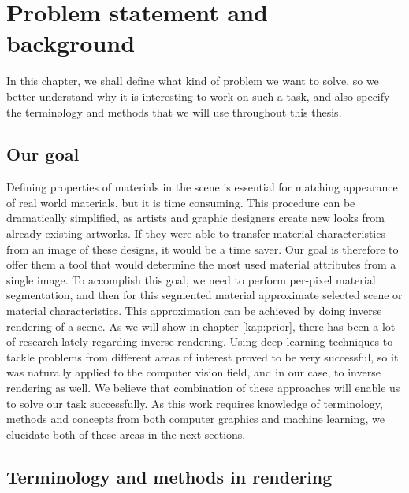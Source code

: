 \chapter{Problem statement and background}
\label{kap:problem}

In this chapter, we shall define what kind of problem we want to solve, so we better understand why it is interesting to work on such a task, and also specify the terminology and methods that we will use throughout this thesis.

\section{Our goal}
Defining properties of materials in the scene is essential for matching appearance of real world materials, but it is time consuming. This procedure can be dramatically simplified, as artists and graphic designers create new looks from already existing artworks. If they were able to transfer material characteristics from an image of these designs, it would be a time saver. Our goal is therefore to offer them a tool that would determine the most used material attributes from a single image.
\newline
To accomplish this goal, we need to perform per-pixel material segmentation, and then for this segmented material approximate selected scene or material characteristics. This approximation can be achieved by doing inverse rendering of a scene.
\newline
As we will show in chapter \ref{kap:prior}, there has been a lot of research lately regarding inverse rendering. Using deep learning techniques to tackle problems from different areas of interest proved to be very successful, so it was naturally applied to the computer vision field, and in our case, to inverse rendering as well. We believe that combination of these approaches will enable us to solve our task successfully.
\newline
As this work requires knowledge of terminology, methods and concepts from both computer graphics and machine learning, we elucidate both of these areas in the next sections.

\section{Terminology and methods in rendering}
